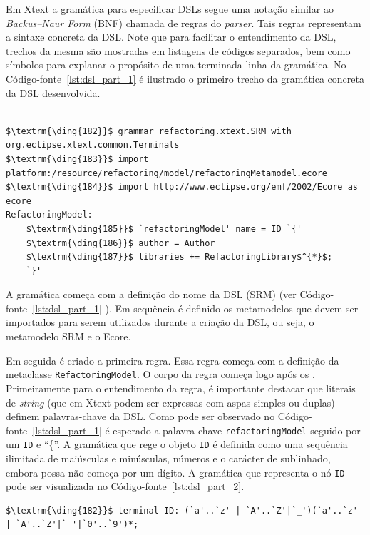 Em Xtext a gramática para especificar DSLs segue uma notação similar ao \textit{Backus–Naur Form} (BNF) chamada de regras do \textit{parser}. Tais regras representam a sintaxe concreta da DSL. Note que para facilitar o entendimento da DSL, trechos da mesma são mostradas em listagens de códigos separados, bem como símbolos para explanar o propósito de uma terminada linha da gramática. No Código-fonte~\ref{lst:dsl_part_1} é ilustrado o primeiro trecho da gramática concreta da DSL desenvolvida. 

\begin{lstlisting}[language=Xtext, frame=single, basicstyle={\scriptsize}, mathescape=true, label={lst:dsl_part_1}, caption={Gramática da DSL - parte 1}]
	
$\textrm{\ding{182}}$ grammar refactoring.xtext.SRM with org.eclipse.xtext.common.Terminals 
$\textrm{\ding{183}}$ import platform:/resource/refactoring/model/refactoringMetamodel.ecore
$\textrm{\ding{184}}$ import http://www.eclipse.org/emf/2002/Ecore as ecore
RefactoringModel: 
	$\textrm{\ding{185}}$ `refactoringModel' name = ID `{'
	$\textrm{\ding{186}}$ author = Author
	$\textrm{\ding{187}}$ libraries += RefactoringLibrary$^{*}$;
	`}'
\end{lstlisting}

A gramática começa com a definição do nome da DSL (SRM) (ver Código-fonte~\ref{lst:dsl_part_1} ). Em sequência é definido os metamodelos que devem ser importados para serem utilizados durante a criação da DSL, ou seja, o metamodelo SRM e o Ecore.

Em seguida é criado a primeira regra. Essa regra começa com a definição da metaclasse \texttt{RefactoringModel}. O corpo da regra começa logo após os \aspas{\texttt{:}}. Primeiramente para o entendimento da regra, é importante destacar que literais de \textit{string} (que em Xtext podem ser expressas com aspas simples ou duplas) definem palavras-chave da DSL. Como pode ser observado no Código-fonte~\ref{lst:dsl_part_1} é esperado a palavra-chave \texttt{refactoringModel} seguido por um \texttt{ID} e ``\{''. A gramática que rege o objeto \texttt{ID} é definida como uma sequência ilimitada de maiúsculas e minúsculas, números e o carácter de sublinhado, embora possa não começa por um dígito. A gramática que representa o nó \texttt{ID} pode ser visualizada no Código-fonte~\ref{lst:dsl_part_2}. 

\begin{lstlisting}[language=Xtext, frame=single, basicstyle=\scriptsize, mathescape=true, label={lst:dsl_part_2}, caption={Gramática da DSL - parte 2}]
	$\textrm{\ding{182}}$ terminal ID: (`a'..`z' | `A'..`Z'|`_')(`a'..`z' | `A'..`Z'|`_'|`0'..`9')*;
\end{lstlisting}

